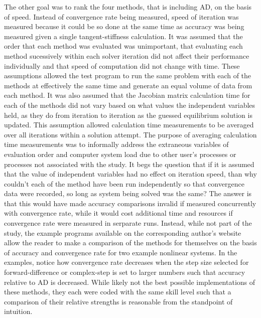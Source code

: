 \documentclass[preprint,12pt]{elsarticle}
\begin{document}
The other goal was to rank the four methods, that is including AD, on the basis of speed. Instead of
convergence rate being measured, speed of iteration was measured because it could be so done at the
same time as accuracy was being measured given a single tangent-stiffness calculation.  It was
assumed that the order that each method was evaluated was unimportant, that evaluating each method
sucessively within each solver iteration did not affect their performance individually and that
speed of computation did not change with time. These assumptions allowed the test program to run the
same problem with each of the methods at effectively the same time and generate an equal volume of
data from each method. It was also assumed that the Jacobian matrix calculation time for each of the
methods did not vary based on what values the independent variables held, as they do from iteration
to iteration as the guessed equilibrium solution is updated.  This assumption allowed calculation
time measurements to be averaged over all iterations within a solution attempt. The purpose of
averaging calculation time measurements was to informally address the extraneous variables of
evaluation order and computer system load due to other user's processes or processes not associated
with the study. It begs the question that if it is assumed that the value of independent variables
had no effect on iteration speed, than why couldn't each of the method have been run independently
so that convergence data were recorded, so long as system being solved was the same? The answer is
that this would have made accuracy comparisons invalid if measured concurrently with convergence
rate, while it would cost additional time and resources if convergence rate were measured in
serparate runs. Instead, while not part of the study, the example programs available on the
corresponding author's website allow the reader to make a comparison of the methods for themselves
on the basis of accuracy and convergence rate for two example nonlinear systems. In the examples,
notice how convergence rate decreases when the step size selected for forward-difference or
complex-step is set to larger numbers such that accuracy relative to AD is decreased. While likely
not the best possible implementations of these methods, they each were coded with the same skill
level such that a comparison of their relative strengths is reasonable from the standpoint of
intuition.
\end{document}
